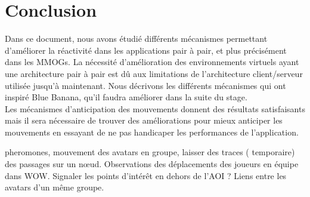 \section{Conclusion}
	Dans ce document, nous avons étudié différents mécanismes permettant d'améliorer la réactivité dans les applications pair à pair, et plus précisément dans les MMOGs. La nécessité d'amélioration des environnements virtuels ayant une architecture pair à pair est dû aux limitations de l'architecture client/serveur utilisée jusqu'à maintenant. Nous décrivons les différents mécanismes qui ont inspiré Blue Banana, qu'il faudra améliorer dans la suite du stage.\\
	Les mécanismes d'anticipation des mouvements donnent des résultats satisfaisants mais il sera nécessaire de trouver des améliorations pour mieux anticiper les mouvements en essayant de ne pas handicaper les performances de l'application.

	pheromones, mouvement des avatars en groupe, laisser des traces ( temporaire) des passages sur un nœud. Observations des déplacements des joueurs en équipe dans WOW.
		Signaler les points d'intérêt en dehors de l'AOI ? 
		Liens entre les avatars d'un même groupe.	
		
